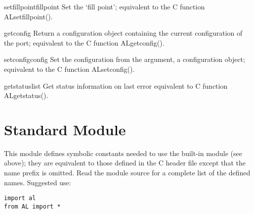 \begin{funcdesc}{setfillpoint}{fillpoint}
Set the `fill point'; equivalent to the C function ALsetfillpoint().
\end{funcdesc}

\begin{funcdesc}{getconfig}{}
Return a configuration object containing the current configuration of
the port; equivalent to the C function ALgetconfig().
\end{funcdesc}

\begin{funcdesc}{setconfig}{config}
Set the configuration from the argument, a configuration object;
equivalent to the C function ALsetconfig().
\end{funcdesc}

\begin{funcdesc}{getstatus}{list}
Get status information on last error
equivalent to C function ALgetstatus().
\end{funcdesc}

\section{Standard Module }

This module defines symbolic constants needed to use the built-in
module  (see above); they are equivalent to those defined in
the C header file  except that the name prefix
 is omitted.  Read the module source for a complete list of
the defined names.  Suggested use:

\bcode\begin{verbatim}
import al
from AL import *
\end{verbatim}\ecode

